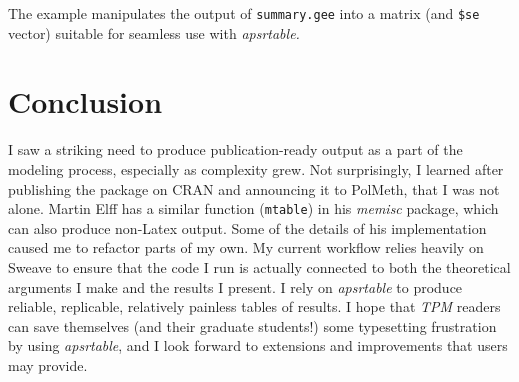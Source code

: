 \documentclass[10pt]{article} %
\begin{document}
The example manipulates the output of \texttt{summary.gee} into a matrix (and \texttt{\$se} vector) suitable for seamless use with \textit{apsrtable.}
\begin{Schunk}
\end{Schunk}


\section{Conclusion}
\label{sec:extending-apsrtable}
I saw a striking need to produce publication-ready output as a part of the modeling process, especially as complexity grew. Not surprisingly, I learned after publishing the package on CRAN and announcing it to PolMeth, that I was not alone. Martin Elff has a similar function (\verb|mtable|) in his \textit{memisc} package, which can also produce non-Latex output. Some of the details of his implementation caused me to refactor parts of my own. My current workflow relies heavily on Sweave to  ensure that the code I run is actually connected to both the theoretical arguments I make and the results I present. I rely on \textit{apsrtable} to produce reliable, replicable, relatively painless tables of results. I hope that \textit{TPM} readers can save themselves (and their graduate students!) some typesetting frustration by using \textit{apsrtable}, and I look forward to extensions and improvements that users may provide.
\end{document}
